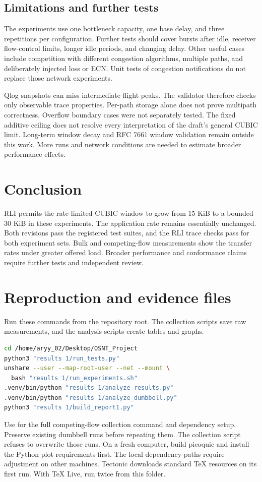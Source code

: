 \documentclass[11pt,a4paper]{article}
\newcommand{\code}[1]{\texttt{\detokenize{#1}}}
\begin{document}
\subsection{Limitations and further tests}
The experiments use one bottleneck capacity, one base delay, and three repetitions per configuration.
Further tests should cover bursts after idle, receiver flow-control limits, longer idle periods, and changing delay.
Other useful cases include competition with different congestion algorithms, multiple paths, and deliberately injected loss or ECN.
Unit tests of congestion notifications do not replace those network experiments.

Qlog snapshots can miss intermediate flight peaks.
The validator therefore checks only observable trace properties.
Per-path storage alone does not prove multipath correctness.
Overflow boundary cases were not separately tested.
The fixed additive ceiling does not resolve every interpretation of the draft's general CUBIC limit.
Long-term window decay and RFC 7661 window validation remain outside this work.
More runs and network conditions are needed to estimate broader performance effects.

\section{Conclusion}
RLI permits the rate-limited CUBIC window to grow from 15 KiB to a bounded 30 KiB in these experiments.
The application rate remains essentially unchanged.
Both revisions pass the registered test suites, and the RLI trace checks pass for both experiment sets.
Bulk and competing-flow measurements show the transfer rates under greater offered load.
Broader performance and conformance claims require further tests and independent review.

\section{Reproduction and evidence files}
Run these commands from the repository root.
The collection scripts save raw measurements, and the analysis scripts create tables and graphs.
\begin{lstlisting}[language=bash]
cd /home/aryy_02/Desktop/OSNT_Project
python3 "results 1/run_tests.py"
unshare --user --map-root-user --net --mount \
  bash "results 1/run_experiments.sh"
.venv/bin/python "results 1/analyze_results.py"
.venv/bin/python "results 1/analyze_dumbbell.py"
python3 "results 1/build_report1.py"
\end{lstlisting}
Use  for the full competing-flow collection command and dependency setup.
Preserve existing dumbbell runs before repeating them.
The collection script refuses to overwrite those runs.
On a fresh computer, build picoquic and install the Python plot requirements first.
The local dependency paths require adjustment on other machines.
Tectonic downloads standard TeX resources on its first run.
With TeX Live, run \code{pdflatex report1.tex} twice from this folder.
\end{document}
